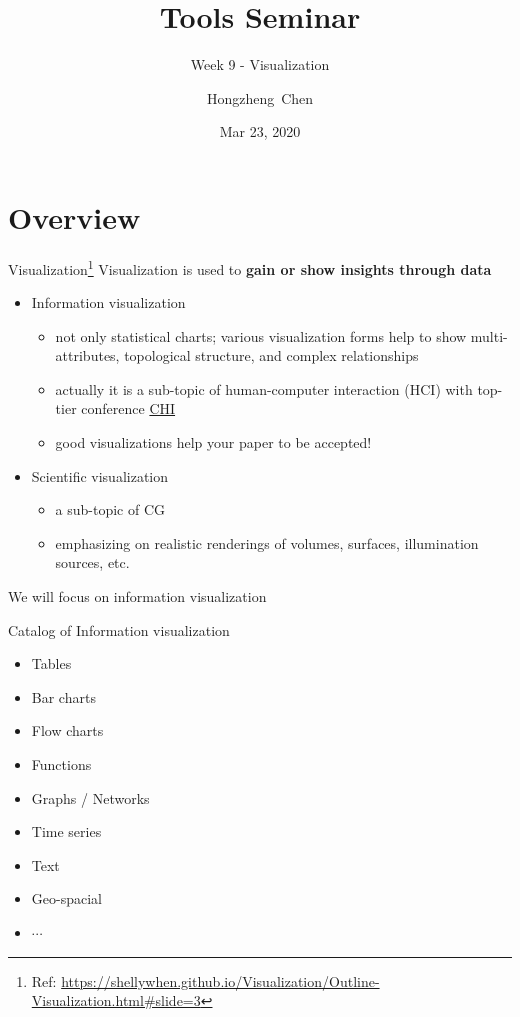 \documentclass{../TexTemplate/myslide}
\title[ToolsSeminar]{Tools Seminar}
\subtitle{Week 9 - Visualization}
\author[chhzh123]{Hongzheng~Chen}
\date[Mar 23, 2020]{Mar 23, 2020}
\begin{document}
\begin{frame}
\titlepage
\end{frame}

\begin{frame}
\tableofcontents
\end{frame}

\section{Overview}
\begin{frame}
\sectionpage
\end{frame}

\begin{frame}{Visualization\protect\footnote{Ref: \url{https://shellywhen.github.io/Visualization/Outline-Visualization.html\#slide=3}}}
Visualization is used to \textbf{gain or show insights through data}
\begin{itemize}
	\item Information visualization
	\begin{itemize}
		\item not only statistical charts; various visualization forms help to show multi-attributes, topological structure, and complex relationships
		\item actually it is a sub-topic of human-computer interaction (HCI) with top-tier conference \href{https://chi2020.acm.org/}{CHI}
		\item good visualizations help your paper to be accepted!
	\end{itemize}
	\item Scientific visualization
	\begin{itemize}
		\item a sub-topic of CG
		\item emphasizing on realistic renderings of volumes, surfaces, illumination sources, etc.
	\end{itemize}
\end{itemize}
We will focus on information visualization
\end{frame}

\begin{frame}{Catalog of Information visualization}
\begin{itemize}
	\item Tables
	\item Bar charts
	\item Flow charts
	\item Functions
	\item Graphs / Networks
	\item Time series
	\item Text
	\item Geo-spacial
	\item $\cdots$
\end{itemize}
\end{frame}
\end{document}

